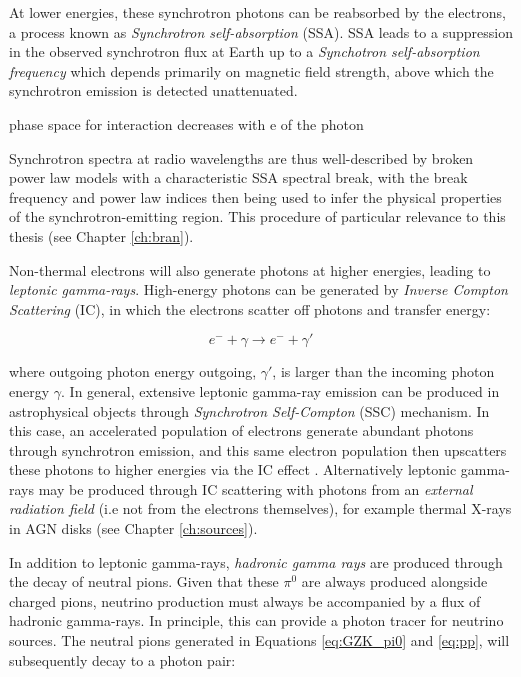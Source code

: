 At lower energies, these synchrotron photons can be reabsorbed by the electrons, a process known as \emph{Synchrotron self-absorption} (SSA). SSA leads to a suppression in the observed synchrotron flux at Earth up to a \emph{Synchotron self-absorption frequency} which depends primarily on magnetic field strength, above which the synchrotron emission is detected unattenuated. 

phase space for interaction decreases with e of the photon

Synchrotron spectra at radio wavelengths are thus well-described by broken power law models with a characteristic SSA spectral break, with the break frequency and power law indices then being used to infer the physical properties of the synchrotron-emitting region.  This procedure of particular relevance to this thesis (see Chapter \ref{ch:bran}). 

Non-thermal electrons will also generate photons at higher energies, leading to \emph{leptonic gamma-rays}. High-energy photons can be generated by \emph{Inverse Compton Scattering} (IC), in which the electrons scatter off photons and transfer energy:

\begin{equation}
	e^{-} + \gamma \rightarrow e^{-} + \gamma'
\end{equation}

where outgoing photon energy outgoing, $\gamma'$, is larger than the incoming photon energy $\gamma$. In general, extensive leptonic gamma-ray emission can be produced in astrophysical objects through \emph{Synchrotron Self-Compton} (SSC) mechanism. In this case, an accelerated population of electrons generate abundant photons through synchrotron emission, and this same electron population then upscatters these photons to higher energies via the IC effect . Alternatively leptonic gamma-rays may be produced through IC scattering with photons from an \emph{external radiation field} (i.e not from the electrons themselves), for example thermal X-rays in AGN disks (see Chapter \ref{ch:sources}).

In addition to leptonic gamma-rays, \emph{hadronic gamma rays} are produced through the decay of neutral pions. Given that these $\pi^{0}$ are always produced alongside charged pions, neutrino production must always be accompanied by a flux of hadronic gamma-rays. In principle, this can provide a photon tracer for neutrino sources. The neutral pions generated in Equations \ref{eq:GZK_pi0} and \ref{eq:pp}, will subsequently decay to a photon pair:

